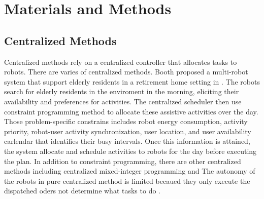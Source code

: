 \chapter{Materials and Methods}




\section{Centralized Methods}
Centralized methods rely on a centralized controller that allocates tasks to robots. There are varies of centralized methods. 
Booth proposed a multi-robot system that support elderly residents in a retirement home setting in  \cite{retire2017}. The robots search for elderly residents in the enviroment in the morning, eliciting their availability and preferences for activities. The centralized scheduler then use constraint programming method to allocate these assistive activities over the day. Those problem-specific constrains includes robot energy consumption, activity priority, robot-user activity synchronization, user location, and user availability carlendar that identifies their busy intervals. Once this information is attained, the system allocate and schedule activities to robots for the day before executing the plan.
In addition to constraint programming, there are other centralized methods including centralized mixed-integer programming \cite{Korsah13} and 
The autonomy of the robots in pure centralized method is limited becaued they only execute the dispatched oders not determine what tasks to do \cite{NUNES201755}. 

